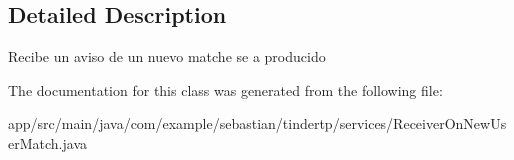 \subsection{Detailed Description}
Recibe un aviso de un nuevo matche se a producido 

The documentation for this class was generated from the following file\+:\begin{DoxyCompactItemize}
\item 
app/src/main/java/com/example/sebastian/tindertp/services/Receiver\+On\+New\+User\+Match.\+java\end{DoxyCompactItemize}
